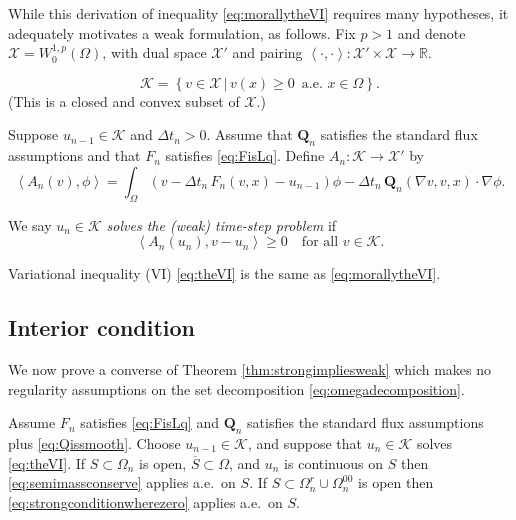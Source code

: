 \documentclass[final,onefignum]{siamart190516}
\newcommand\bQ{\mathbf{Q}}
\newcommand{\grad}{\nabla}
\newcommand{\ip}[2]{\ensuremath{\left<#1,#2\right>}}
\newcommand\RR{\mathbb{R}}
\begin{document}
While this derivation of inequality \eqref{eq:morallytheVI} requires many hypotheses, it adequately motivates a weak formulation, as follows.  Fix $p>1$ and denote $\mathcal{X} = W_0^{1,p}(\Omega)$, with dual space $\mathcal{X}'$ and pairing $\ip{\cdot}{\cdot}: \mathcal{X}' \times \mathcal{X} \to \RR$.

\begin{definition}
\begin{equation}
\mathcal{K} = \left\{v \in \mathcal{X} \,\big|\, v(x) \ge 0\, \text{ a.e.~} x \in \Omega\right\}.  \label{eq:defineK}
\end{equation}
(This is a closed and convex subset of $\mathcal{X}$.)
\end{definition}

\begin{definition}  Suppose $u_{n-1}\in\mathcal{K}$ and $\Delta t_n>0$.  Assume that $\bQ_n$ satisfies the standard flux assumptions and that $F_n$ satisfies \eqref{eq:FisLq}.  Define $A_n:\mathcal{K} \to \mathcal{X}'$ by
\begin{equation}
  \ip{A_n(v)}{\phi} = \int_\Omega \left(v - \Delta t_n\, F_n(v,x) - u_{n-1}\right)\phi - \Delta t_n\, \bQ_n(\grad v,v,x) \cdot \grad\phi. \label{eq:defineAn}
\end{equation}
\end{definition}

\begin{definition}  We say $u_n\in\mathcal{K}$ \emph{solves the (weak) time-step problem} if
\begin{equation}
  \ip{A_n(u_n)}{v-u_n} \ge 0 \quad \text{for all } v \in \mathcal{K}.  \label{eq:theVI}
\end{equation}
\end{definition}

Variational inequality (VI) \eqref{eq:theVI} is the same as \eqref{eq:morallytheVI}.

\subsection{Interior condition}  \label{subsec:interior}  We now prove a converse of Theorem \ref{thm:strongimpliesweak} which makes no regularity assumptions on the set decomposition \eqref{eq:omegadecomposition}.

\begin{theorem} \label{thm:weakimpliesstrong}  Assume $F_n$ satisfies \eqref{eq:FisLq} and $\bQ_n$ satisfies the standard flux assumptions plus \eqref{eq:Qissmooth}.  Choose $u_{n-1}\in\mathcal{K}$, and suppose that $u_n\in\mathcal{K}$ solves \eqref{eq:theVI}.  If $S \subset \Omega_n$ is open, $\overline{S}\subset \Omega$, and $u_n$ is continuous on $S$ then \eqref{eq:semimassconserve} applies a.e.~on $S$.  If $S \subset \Omega_n^r \cup \Omega_n^{00}$ is open then \eqref{eq:strongconditionwherezero} applies a.e.~on $S$.
\end{theorem}
\end{document}
